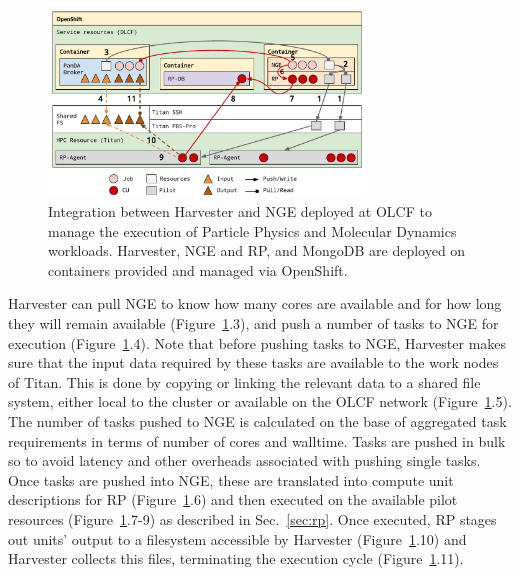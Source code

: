 \documentclass{webofc}
\begin{document}
\begin{figure}
  \centering
  \includegraphics[width=0.75\textwidth]{figures/integration.pdf}
  \caption{Integration between Harvester and NGE deployed at OLCF to manage
           the execution of Particle Physics and Molecular Dynamics
           workloads. Harvester, NGE and RP, and MongoDB are deployed on
           containers provided and managed via
           OpenShift.}\label{fig:integration}
\end{figure}

Harvester can pull NGE to know how many cores are available and for how long
they will remain available (Figure~\ref{fig:integration}.3), and push a
number of tasks to NGE for execution (Figure~\ref{fig:integration}.4). Note
that before pushing tasks to NGE, Harvester makes sure that the input data
required by these tasks are available to the work nodes of Titan. This is
done by copying or linking the relevant data to a shared file system, either
local to the cluster or available on the OLCF network
(Figure~\ref{fig:integration}.5). The number of tasks pushed to NGE is
calculated on the base of aggregated task requirements in terms of number of
cores and walltime. Tasks are pushed in bulk so to avoid latency and other
overheads associated with pushing single tasks. Once tasks are pushed into
NGE, these are translated into compute unit descriptions for RP
(Figure~\ref{fig:integration}.6) and then executed on the available pilot
resources (Figure~\ref{fig:integration}.7-9) as described in
Sec.~\ref{sec:rp}. Once executed, RP stages out units' output to a filesystem
accessible by Harvester (Figure~\ref{fig:integration}.10) and Harvester
collects this files, terminating the execution cycle
(Figure~\ref{fig:integration}.11).
\end{document}
